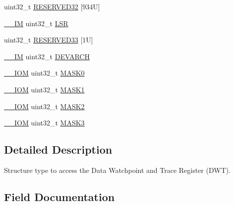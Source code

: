\begin{DoxyCompactItemize}
\item 
uint32\+\_\+t \mbox{\hyperlink{struct_d_w_t___type_a487f018ce95e73d28fa5879a0a55d387}{R\+E\+S\+E\+R\+V\+E\+D32}} \mbox{[}934\+U\mbox{]}
\item 
\mbox{\hyperlink{core__cm4_8h_a4cc1649793116d7c2d8afce7a4ffce43}{\+\_\+\+\_\+\+IM}} uint32\+\_\+t \mbox{\hyperlink{struct_d_w_t___type_a7219432d03f6cd1d220f4fe10aef4880}{L\+SR}}
\item 
uint32\+\_\+t \mbox{\hyperlink{struct_d_w_t___type_a4b9487848ca472518a2638940bf774f3}{R\+E\+S\+E\+R\+V\+E\+D33}} \mbox{[}1\+U\mbox{]}
\item 
\mbox{\hyperlink{core__cm4_8h_a4cc1649793116d7c2d8afce7a4ffce43}{\+\_\+\+\_\+\+IM}} uint32\+\_\+t \mbox{\hyperlink{struct_d_w_t___type_ae370aa5dc47fe03310e1d847333030e7}{D\+E\+V\+A\+R\+CH}}
\item 
\mbox{\hyperlink{core__cm4_8h_ab6caba5853a60a17e8e04499b52bf691}{\+\_\+\+\_\+\+I\+OM}} uint32\+\_\+t \mbox{\hyperlink{struct_d_w_t___type_a84089e08ecf14b86f92c727a568ceac4}{M\+A\+S\+K0}}
\item 
\mbox{\hyperlink{core__cm4_8h_ab6caba5853a60a17e8e04499b52bf691}{\+\_\+\+\_\+\+I\+OM}} uint32\+\_\+t \mbox{\hyperlink{struct_d_w_t___type_a6f663226a4f3409b0a73651b5a90b3af}{M\+A\+S\+K1}}
\item 
\mbox{\hyperlink{core__cm4_8h_ab6caba5853a60a17e8e04499b52bf691}{\+\_\+\+\_\+\+I\+OM}} uint32\+\_\+t \mbox{\hyperlink{struct_d_w_t___type_a32213bf45fbe36e1823e69028f7edef2}{M\+A\+S\+K2}}
\item 
\mbox{\hyperlink{core__cm4_8h_ab6caba5853a60a17e8e04499b52bf691}{\+\_\+\+\_\+\+I\+OM}} uint32\+\_\+t \mbox{\hyperlink{struct_d_w_t___type_a51e9ef8e2238e82f3b40aa2599397637}{M\+A\+S\+K3}}
\end{DoxyCompactItemize}


\subsection{Detailed Description}
Structure type to access the Data Watchpoint and Trace Register (D\+WT). 

\subsection{Field Documentation}
\mbox{\label{struct_d_w_t___type_a5d0c69187f8abc99ecbde49431cf0050}} 
